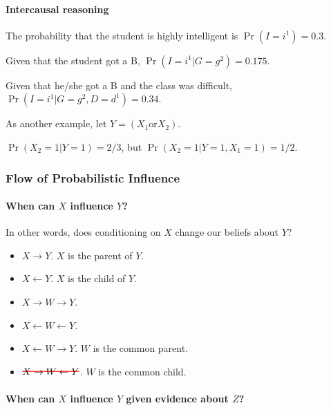 \documentclass[12pt]{article}
\newcommand\hcancel[2][black]{\setbox0=\hbox{$#2$}
\rlap{\raisebox{.45\ht0}{\textcolor{#1}{\rule{\wd0}{1pt}}}}#2}
\begin{document}
\paragraph{Intercausal reasoning}

The probability that the student is highly intelligent is $\Pr(I = i^1) = 0.3$.

Given that the student got a B, $\Pr(I = i^1 | G = g^2) = 0.175$.

Given that he/she got a B and the class was difficult, $\Pr(I = i^1 | G = g^2, D = d^1) = 0.34$.


As another example, let $Y = (X_1 \text{or} X_2)$.

$\Pr(X_2 = 1 | Y = 1) = 2/3$, but $\Pr(X_2 = 1 | Y = 1, X_1 = 1) = 1/2$.


\subsubsection{Flow of Probabilistic Influence}
\paragraph{When can $X$ influence $Y$?} In other words, does conditioning on $X$ change our beliefs about $Y$?

\begin{itemize}
  \item $X \rightarrow Y$. $X$ is the parent of $Y$.

  \item $X \leftarrow Y$. $X$ is the child of $Y$.

  \item $X \rightarrow W \rightarrow Y$.

  \item $X \leftarrow W \leftarrow Y$.

  \item $X \leftarrow W \rightarrow Y$. $W$ is the common parent.

  \item $\hcancel[red]{X \rightarrow W \leftarrow Y}$. $W$ is the common child.

\end{itemize}

\paragraph{When can $X$ influence $Y$ given evidence about $Z$?}
\end{document}

